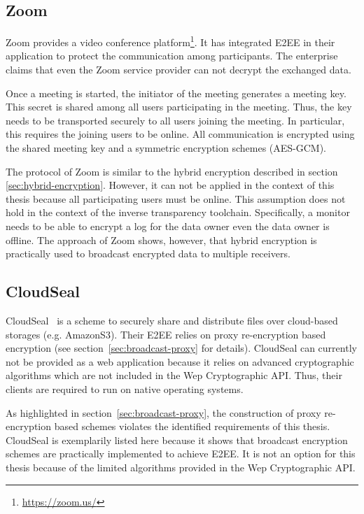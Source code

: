 \documentclass[../main.tex]{subfiles}
\begin{document}
\subsection{Zoom}
Zoom provides a video conference platform\footnote{\url{https://zoom.us/}}. 
It has integrated E2EE in their application to protect the communication among participants.
The enterprise claims that even the Zoom service provider can not decrypt the exchanged data.~\cite{Blum2020}

Once a meeting is started, the initiator of the meeting generates a meeting key.
This secret is shared among all users participating in the meeting.
Thus, the key needs to be transported securely to all users joining the meeting.
In particular, this requires the joining users to be online.
All communication is encrypted using the shared meeting key and a symmetric encryption schemes (AES-GCM).
~\cite{Isobe2021}

The protocol of Zoom is similar to the hybrid encryption described in section \ref{sec:hybrid-encryption}.
However, it can not be applied in the context of this thesis because all participating users must be online.
This assumption does not hold in the context of the inverse transparency toolchain.
Specifically, a monitor needs to be able to encrypt a log for the data owner even the data owner is offline.
The approach of Zoom shows, however, that hybrid encryption is practically used to broadcast encrypted data to multiple receivers.

\subsection{CloudSeal}
CloudSeal~\cite{Xiong2012} is a scheme to securely share and distribute files over cloud-based storages (e.g. AmazonS3).
Their E2EE relies on proxy re-encryption based encryption (see section~\ref{sec:broadcast-proxy} for details).
CloudSeal can currently not be provided as a web application because it relies on advanced cryptographic algorithms which are not included in the Wep Cryptographic API.
Thus, their clients are required to run on native operating systems.~\cite{Xiong2012}

As highlighted in section~\ref{sec:broadcast-proxy}, the construction of proxy re-encryption based schemes violates the identified requirements of this thesis.
CloudSeal is exemplarily listed here because it shows that broadcast encryption schemes are practically implemented to achieve E2EE.
It is not an option for this thesis because of the limited algorithms provided in the Wep Cryptographic API.
\end{document}
